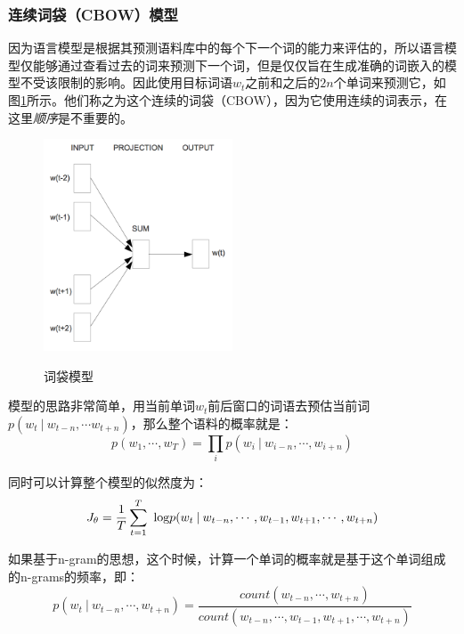 \subsubsection{连续词袋（CBOW）模型}
因为语言模型是根据其预测语料库中的每个下一个词的能力来评估的，所以语言模型仅能够通过查看过去的词来预测下一个词，但是仅仅旨在生成准确的词嵌入的模型不受该限制的影响。因此使用目标词语$w_t$之前和之后的$2n$个单词来预测它，如图\ref{fig:cbow}所示。他们称之为这个连续的词袋（CBOW），因为它使用连续的词表示，在这里\emph{顺序}是不重要的。
   \begin{figure}[h]
\centering
  \includegraphics[width=0.5\textwidth]{./graph/cbow.png}\\
  \caption{词袋模型\cite{word2vec}}\label{fig:cbow}
\end{figure} 

模型的思路非常简单，用当前单词$w_t$前后窗口的词语去预估当前词$p(w_t \: | \: w_{t-n} , \cdots w_{t+n})$，那么整个语料的概率就是：
\begin{equation}
p(w_1 , \cdots , w_T) = \prod\limits_i p(w_i \: | \: w_{i-n} , \cdots , w_{i+n})
\end{equation}

同时可以计算整个模型的似然度为：
\begin{equation}
J_\theta = \frac{1}{T}\sum\limits_{t=1}^T\ \text{log} \space p(w_t \: | \: w_{t-n} , \cdots , w_{t-1}, w_{t+1}, \cdots , w_{t+n})
\end{equation}

如果基于n-gram的思想，这个时候，计算一个单词的概率就是基于这个单词组成的n-grams的频率，即：
\begin{equation}
p(w_t \: | \: w_{t-n} , \cdots , w_{t+n}) = \dfrac{count(w_{t-n}, \cdots , w_{t+n})}{count({w_{t-n}, \cdots , w_{t-1}, w_{t+1},\cdots, w_{t+n}})}
\end{equation}

